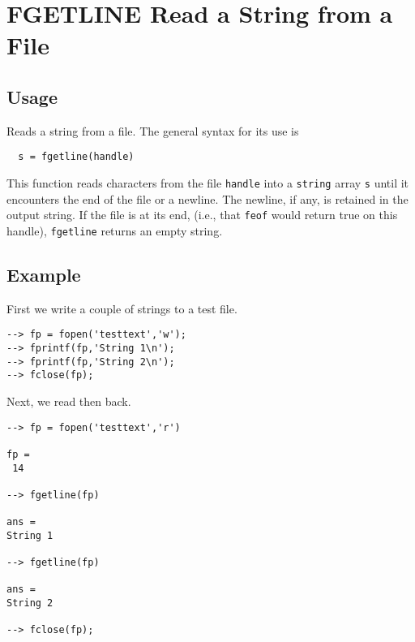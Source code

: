 \section{FGETLINE Read a String from a File}

\subsection{Usage}

Reads a string from a file.  The general syntax for its use
is
\begin{verbatim}
  s = fgetline(handle)
\end{verbatim}
This function reads characters from the file \verb|handle| into
a \verb|string| array \verb|s| until it encounters the end of the file
or a newline.  The newline, if any, is retained in the output
string.  If the file is at its end, (i.e., that \verb|feof| would
return true on this handle), \verb|fgetline| returns an empty
string.
\subsection{Example}

First we write a couple of strings to a test file.
\begin{verbatim}
--> fp = fopen('testtext','w');
--> fprintf(fp,'String 1\n');
--> fprintf(fp,'String 2\n');
--> fclose(fp);
\end{verbatim}
Next, we read then back.
\begin{verbatim}
--> fp = fopen('testtext','r')

fp = 
 14 

--> fgetline(fp)

ans = 
String 1

--> fgetline(fp)

ans = 
String 2

--> fclose(fp);
\end{verbatim}
